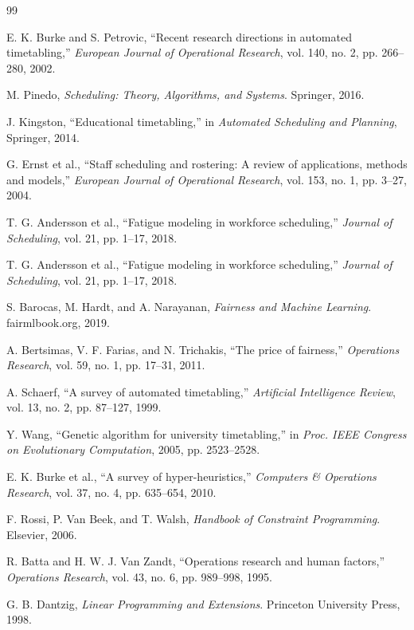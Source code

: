 \documentclass[journal,onecolumn]{IEEEtran}
\begin{document}
\begin{thebibliography}{99}

E. K. Burke and S. Petrovic, ``Recent research directions in automated timetabling,'' \textit{European Journal of Operational Research}, vol. 140, no. 2, pp. 266--280, 2002.

M. Pinedo, \textit{Scheduling: Theory, Algorithms, and Systems}. Springer, 2016.

J. Kingston, ``Educational timetabling,'' in \textit{Automated Scheduling and Planning}, Springer, 2014.

G. Ernst et al., ``Staff scheduling and rostering: A review of applications, methods and models,'' \textit{European Journal of Operational Research}, vol. 153, no. 1, pp. 3--27, 2004.

T. G. Andersson et al., ``Fatigue modeling in workforce scheduling,'' \textit{Journal of Scheduling}, vol. 21, pp. 1--17, 2018.

T. G. Andersson et al., ``Fatigue modeling in workforce scheduling,'' \textit{Journal of Scheduling}, vol. 21, pp. 1--17, 2018.

S. Barocas, M. Hardt, and A. Narayanan, \textit{Fairness and Machine Learning}. fairmlbook.org, 2019.

A. Bertsimas, V. F. Farias, and N. Trichakis, ``The price of fairness,'' \textit{Operations Research}, vol. 59, no. 1, pp. 17--31, 2011.

A. Schaerf, ``A survey of automated timetabling,'' \textit{Artificial Intelligence Review}, vol. 13, no. 2, pp. 87--127, 1999.

Y. Wang, ``Genetic algorithm for university timetabling,'' in \textit{Proc. IEEE Congress on Evolutionary Computation}, 2005, pp. 2523--2528.

E. K. Burke et al., ``A survey of hyper-heuristics,'' \textit{Computers \& Operations Research}, vol. 37, no. 4, pp. 635--654, 2010.

F. Rossi, P. Van Beek, and T. Walsh, \textit{Handbook of Constraint Programming}. Elsevier, 2006.

R. Batta and H. W. J. Van Zandt, ``Operations research and human factors,'' \textit{Operations Research}, vol. 43, no. 6, pp. 989--998, 1995.

G. B. Dantzig, \textit{Linear Programming and Extensions}. Princeton University Press, 1998.


\end{thebibliography}
\end{document}
